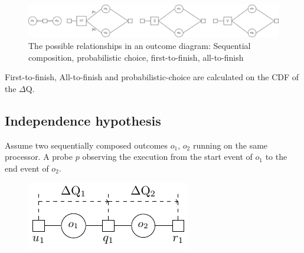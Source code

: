     \begin{figure}[H]
        \begin{center}
            \includegraphics[width = \textwidth]{tikz/op.pdf}
        \end{center}
        \caption{The possible relationships in an outcome diagram: Sequential composition, probabilistic choice, first-to-finish, all-to-finish}
    \end{figure}
    First-to-finish, All-to-finish and probabilistic-choice are calculated on the CDF of the $\Delta$Q.
    \subsection{Independence hypothesis}
        
        Assume two sequentially composed outcomes $o_1$, $o_2$ running on the same processor. A probe $p$ observing the execution from the start event of $o_1$ to the end event of $o_2$. 
        \begin{figure}[H]
            \begin{center}
                \includegraphics[scale=1.6]{tikz/indep.pdf}
            \end{center}
        \end{figure}
        

